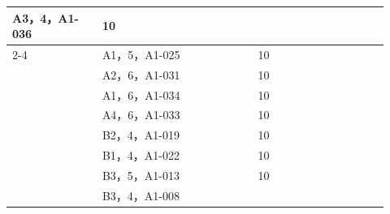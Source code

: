 \documentclass[UTF8,10pt,a4paper,fontset=fandol]{ctexart}
\newcommand{\fieldvalue}[1]{#1}
\newcommand{\handwritten}[1]{#1}
\begin{document}
\begin{center}
\begin{tabular}{|p{0.22\linewidth}|p{0.38\linewidth}|p{0.18\linewidth}|p{0.14\linewidth}|}
\fieldvalue{\handwritten{A3，4，A1-036}}
&
\fieldvalue{\handwritten{10}} &\\
\cline{2-4}
&
\fieldvalue{\handwritten{A1，5，A1-025}}
&
\fieldvalue{\handwritten{10}} &\\
\hline
\multirow{9}{*}{\centering\fieldvalue{\handwritten{112084}}}
&
\fieldvalue{\handwritten{A2，6，A1-031}}
&
\fieldvalue{\handwritten{10}} &\\
\cline{2-4}
&
\fieldvalue{\handwritten{A1，6，A1-034}}
&
\fieldvalue{\handwritten{10}} &\\
\cline{2-4}
&
\fieldvalue{\handwritten{A4，6，A1-033}}
&
\fieldvalue{\handwritten{10}} &\\
\cline{2-4}
&
\fieldvalue{\handwritten{B2，4，A1-019}}
&
\fieldvalue{\handwritten{10}} &\\
\cline{2-4}
&
\fieldvalue{\handwritten{B1，4，A1-022}}
&
\fieldvalue{\handwritten{10}} &\\
\cline{2-4}
&
\fieldvalue{\handwritten{B3，5，A1-013}}
&
\fieldvalue{\handwritten{10}} &\\
\cline{2-4}
&
\fieldvalue{\handwritten{B3，4，A1-008}}
&

\end{tabular}
\end{center}
\end{document}
